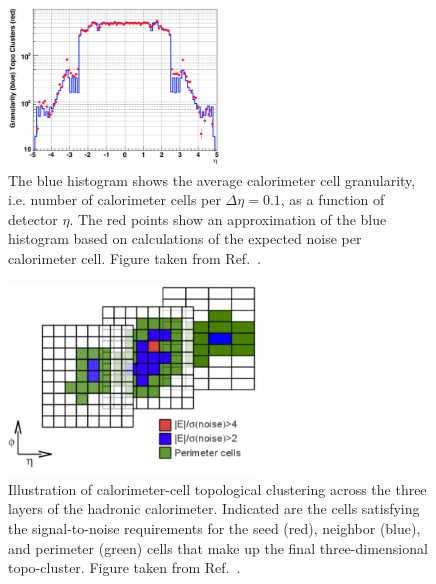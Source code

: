 \begin{figure}[!htb]
    \begin{center}
        \includegraphics[width=0.5\textwidth]{figures/chapter3/jets/calocell_granularity}
        \caption{
            The blue histogram shows the average calorimeter cell granularity, i.e. number of calorimeter cells per
            $\Delta \eta = 0.1$, as a function of detector $\eta$. The red points show an approximation of the blue
            histogram based on calculations of the expected noise per calorimeter cell.
            Figure taken from Ref.~\cite{Lampl:2008zz}.
        }
        \label{fig:calocell_granularity}
    \end{center}
\end{figure}

\begin{figure}[!htb]
    \begin{center}
    \includegraphics[width=0.6\textwidth]{figures/chapter3/jets/calocell_clustering_cartoon}
    \caption{
        Illustration of calorimeter-cell topological clustering across the three layers of the
        hadronic calorimeter. Indicated are the cells satisfying the signal-to-noise requirements for
        the seed (red), neighbor (blue), and perimeter (green) cells that make up the final three-dimensional topo-cluster.
        Figure taken from Ref.~\cite{MontejoBerlingen:2053769}.
    }
    \label{fig:calocell_clustering}
    \end{center}
\end{figure}
\FloatBarrier


